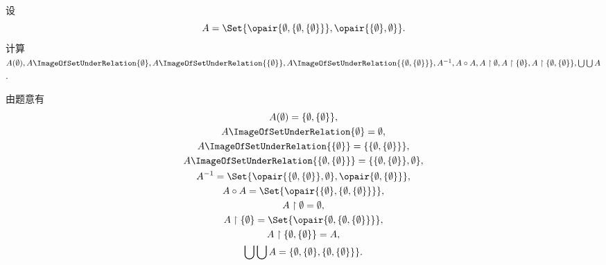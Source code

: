 \begin{example}
设\[
	A = \Set{
		\opair{\emptyset,\{\emptyset,\{\emptyset\}\}},
		\opair{\{\emptyset\},\emptyset}
	}.
\]
计算\(A(\emptyset),
A\ImageOfSetUnderRelation{\emptyset},
A\ImageOfSetUnderRelation{\{\emptyset\}},
A\ImageOfSetUnderRelation{\{\emptyset,\{\emptyset\}\}},
A^{-1},
A \circ A,
A \setrestrict \emptyset,
A \setrestrict \{\emptyset\},
A \setrestrict \{\emptyset,\{\emptyset\}\},
\bigcup\bigcup A\).
\begin{solution}
由题意有\begin{gather*}
	A(\emptyset)
	= \{\emptyset,\{\emptyset\}\}, \\
	A\ImageOfSetUnderRelation{\emptyset}
	= \emptyset, \\
	A\ImageOfSetUnderRelation{\{\emptyset\}}
	= \{\{\emptyset,\{\emptyset\}\}\}, \\
	A\ImageOfSetUnderRelation{\{\emptyset,\{\emptyset\}\}}
	= \{\{\emptyset,\{\emptyset\}\},\emptyset\}, \\
	A^{-1}
	= \Set{
		\opair{\{\emptyset,\{\emptyset\}\},\emptyset},
		\opair{\emptyset,\{\emptyset\}}
	}, \\
	A \circ A
	= \Set{
		\opair{\{\emptyset\},\{\emptyset,\{\emptyset\}\}}
	}, \\
	A \setrestrict \emptyset
	= \emptyset, \\
	A \setrestrict \{\emptyset\}
	= \Set{
		\opair{\emptyset,\{\emptyset,\{\emptyset\}\}}
	}, \\
	A \setrestrict \{\emptyset,\{\emptyset\}\}
	= A, \\
	\bigcup\bigcup A
	= \{
		\emptyset,
		\{\emptyset\},
		\{\emptyset,\{\emptyset\}\}
	\}.
\end{gather*}
\end{solution}
\end{example}


